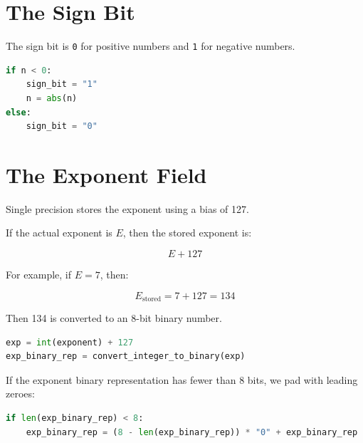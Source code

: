 \documentclass[11pt]{article}
\begin{document}
\begin{center}
\end{center}

\section{The Sign Bit}

The sign bit is \texttt{0} for positive numbers and \texttt{1} for negative numbers.

\begin{lstlisting}[language=Python]
if n < 0:
    sign_bit = "1"
    n = abs(n)
else:
    sign_bit = "0"
\end{lstlisting}

\section{The Exponent Field}

Single precision stores the exponent using a bias of 127.

If the actual exponent is $E$, then the stored exponent is:

\[
E + 127
\]

For example, if $E = 7$, then:

\[
E_{\text{stored}} = 7 + 127 = 134
\]

Then 134 is converted to an 8-bit binary number.

\begin{lstlisting}[language=Python]
exp = int(exponent) + 127
exp_binary_rep = convert_integer_to_binary(exp)
\end{lstlisting}

If the exponent binary representation has fewer than 8 bits, we pad with leading zeroes:

\begin{lstlisting}[language=Python]
if len(exp_binary_rep) < 8:
    exp_binary_rep = (8 - len(exp_binary_rep)) * "0" + exp_binary_rep
\end{lstlisting}
\end{document}
